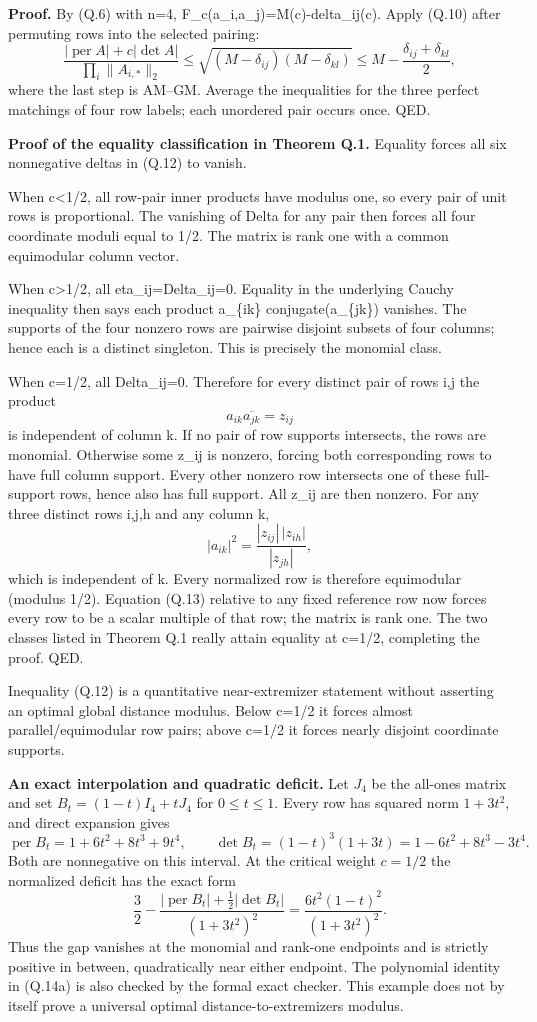 \documentclass[
  11pt,
]{article}
\begin{document}
\textbf{Proof.} By (Q.6) with n=4, F\_c(a\_i,a\_j)=M(c)-delta\_ij(c).
Apply (Q.10) after permuting rows into the selected pairing: \[
\frac{|\operatorname{per}A|+c|\det A|}{\prod_i\|A_{i,*}\|_2}
\le\sqrt{(M-\delta_{ij})(M-\delta_{kl})}
\le M-\frac{\delta_{ij}+\delta_{kl}}2,
\] where the last step is AM--GM. Average the inequalities for the three
perfect matchings of four row labels; each unordered pair occurs once.
QED.

\textbf{Proof of the equality classification in Theorem Q.1.} Equality
forces all six nonnegative deltas in (Q.12) to vanish.

When c\textless1/2, all row-pair inner products have modulus one, so
every pair of unit rows is proportional. The vanishing of Delta for any
pair then forces all four coordinate moduli equal to 1/2. The matrix is
rank one with a common equimodular column vector.

When c\textgreater1/2, all eta\_ij=Delta\_ij=0. Equality in the
underlying Cauchy inequality then says each product a\_\{ik\}
conjugate(a\_\{jk\}) vanishes. The supports of the four nonzero rows are
pairwise disjoint subsets of four columns; hence each is a distinct
singleton. This is precisely the monomial class.

When c=1/2, all Delta\_ij=0. Therefore for every distinct pair of rows
i,j the product \[
a_{ik}\overline{a_{jk}}=z_{ij}\tag{Q.13}
\] is independent of column k. If no pair of row supports intersects,
the rows are monomial. Otherwise some z\_ij is nonzero, forcing both
corresponding rows to have full column support. Every other nonzero row
intersects one of these full-support rows, hence also has full support.
All z\_ij are then nonzero. For any three distinct rows i,j,h and any
column k, \[
|a_{ik}|^2=\frac{|z_{ij}|\,|z_{ih}|}{|z_{jh}|},\tag{Q.14}
\] which is independent of k. Every normalized row is therefore
equimodular (modulus 1/2). Equation (Q.13) relative to any fixed
reference row now forces every row to be a scalar multiple of that row;
the matrix is rank one. The two classes listed in Theorem Q.1 really
attain equality at c=1/2, completing the proof. QED.

Inequality (Q.12) is a quantitative near-extremizer statement without
asserting an optimal global distance modulus. Below c=1/2 it forces
almost parallel/equimodular row pairs; above c=1/2 it forces nearly
disjoint coordinate supports.

\textbf{An exact interpolation and quadratic deficit.} Let \(J_4\) be
the all-ones matrix and set \(B_t=(1-t)I_4+tJ_4\) for \(0\le t\le1\).
Every row has squared norm \(1+3t^2\), and direct expansion gives \[
\operatorname{per}B_t=1+6t^2+8t^3+9t^4,\qquad
\det B_t=(1-t)^3(1+3t)=1-6t^2+8t^3-3t^4.
\] Both are nonnegative on this interval. At the critical weight
\(c=1/2\) the normalized deficit has the exact form \[
\boxed{
\frac32-
\frac{|\operatorname{per}B_t|+\frac12|\det B_t|}
{(1+3t^2)^2}
=\frac{6t^2(1-t)^2}{(1+3t^2)^2}.}\tag{Q.14a}
\] Thus the gap vanishes at the monomial and rank-one endpoints and is
strictly positive in between, quadratically near either endpoint. The
polynomial identity in (Q.14a) is also checked by the formal exact
checker. This example does not by itself prove a universal optimal
distance-to-extremizers modulus.
\end{document}

